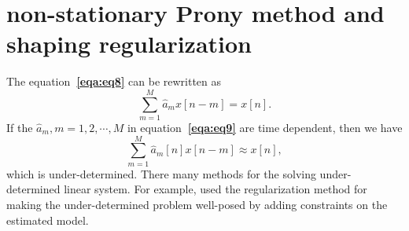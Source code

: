 \section{non-stationary Prony method and shaping regularization}
The equation\textbf{~\ref{eqa:eq8}} can be rewritten as
\begin{equation}
    \label{eqa:eq9}
\sum_{m=1}^{M}\hat{a}_m x[n-m] = x[n].
\end{equation}
If the $\hat{a}_m, m=1,2,\cdots,M$ in equation\textbf{~\ref{eqa:eq9}} are time dependent, then we have
\begin{equation}
    \label{eqa:eq10}
    \sum_{m=1}^{M}\hat{a}_m[n] x[n-m] \approx x[n],
\end{equation}
which is under-determined. There many methods for the solving 
under-determined linear system. For example, \citet[]{tikhonov} 
used the regularization method for making the under-determined 
problem well-posed by adding constraints on the estimated model.
